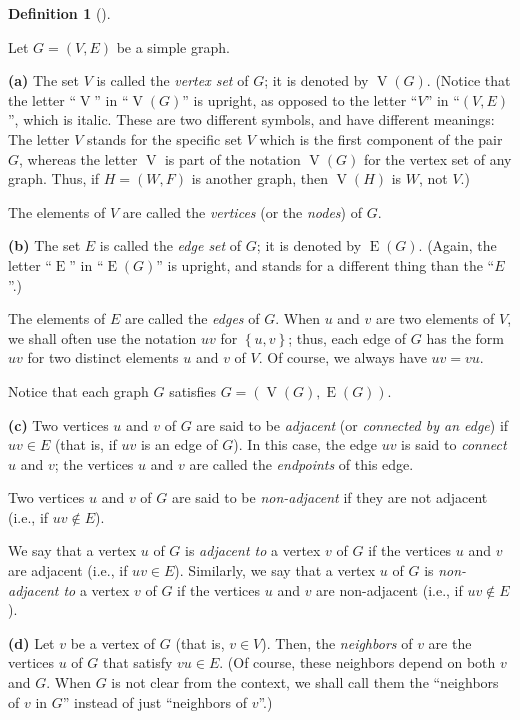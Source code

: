 \documentclass[numbers=enddot,12pt,final,onecolumn,notitlepage]{scrartcl}%
\theoremstyle{definition}
\newtheorem{defi}[theo]{Definition}
\newenvironment{definition}[1][]
{\begin{defi}[#1]\begin{leftbar}}
{\end{leftbar}\end{defi}}
\newcommand{\set}[1]{\left\{ #1 \right\}}
\newcommand{\tup}[1]{\left( #1 \right)}
\newcommand{\verts}[1]{\operatorname{V}\left( #1 \right)}
\newcommand{\edges}[1]{\operatorname{E}\left( #1 \right)}
\begin{document}
\begin{definition} \label{def.intro.simple.VE}
Let $G = \tup{V, E}$ be a simple graph.

\textbf{(a)} The set $V$ is called the \textit{vertex set} of $G$;
it is denoted by $\verts{G}$. (Notice that the letter
``$\operatorname{V}$'' in ``$\verts{G}$'' is upright, as opposed to
the letter ``$V$'' in ``$\tup{V, E}$'', which is italic.
These are two different symbols, and have different meanings: The
letter $V$ stands for the specific set $V$ which is the first
component of the pair $G$, whereas the letter
$\operatorname{V}$ is part of the notation $\verts{G}$ for the
vertex set of any graph. Thus, if $H = \left(W, F\right)$ is another
graph, then $\verts{H}$ is $W$, not $V$.)

The elements of $V$ are called the \textit{vertices} (or the
\textit{nodes}) of $G$.

\textbf{(b)} The set $E$ is called the \textit{edge set} of $G$; it
is denoted by $\edges{G}$. (Again, the letter ``$\operatorname{E}$''
in ``$\edges{G}$'' is upright, and stands for a different thing than
the ``$E$''.)

The elements of $E$ are called the \textit{edges} of $G$. When $u$ and
$v$ are two elements of $V$, we shall often use the notation $uv$ for
$\set{u, v}$; thus, each edge of $G$ has the form $uv$ for two
distinct elements $u$ and $v$ of $V$. Of course, we always have
$uv = vu$.

Notice that each graph $G$ satisfies $G = \tup{\verts{G}, \edges{G}}$.

\textbf{(c)} Two vertices $u$ and $v$ of $G$ are said to be
\textit{adjacent} (or \textit{connected by an edge}) if $uv \in E$
(that is, if $uv$ is an edge of $G$). In this case, the edge $uv$ is
said to \textit{connect} $u$ and $v$; the vertices $u$ and $v$ are
called the \textit{endpoints} of this edge.

Two vertices $u$ and $v$ of $G$
are said to be \textit{non-adjacent} if they are not adjacent (i.e.,
if $uv \notin E$).

We say that a vertex $u$ of $G$ is \textit{adjacent to} a vertex $v$
of $G$ if the vertices $u$ and $v$ are adjacent (i.e., if $uv \in E$).
Similarly, we say that a vertex $u$ of $G$ is \textit{non-adjacent to}
a vertex $v$ of $G$ if the vertices $u$ and $v$ are non-adjacent
(i.e., if $uv \notin E$).

\textbf{(d)} Let $v$ be a vertex of $G$ (that is, $v \in V$). Then,
the \textit{neighbors} of $v$ are the vertices $u$ of $G$ that
satisfy $vu \in E$. (Of course, these neighbors depend on both $v$ and
$G$. When $G$ is not clear from the context, we shall call them the
``neighbors of $v$ in $G$'' instead of just ``neighbors of $v$''.)
\end{definition}
\end{document}
